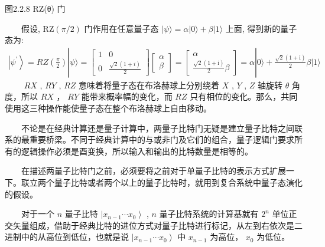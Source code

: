 \documentclass[a4paper,11pt,english]{sphinxmanual}
\begin{document}
\begin{center}图2.2.8 RZ(θ) 门
\end{center}
\sphinxAtStartPar
  假设,  \(\mathrm{RZ}(\pi / 2)\) 门作用在任意量子态  \(|\psi\rangle=\alpha|0\rangle+\beta|1\rangle\) 上面, 得到新的量子态为:
\begin{equation*}
\begin{split}\left|\psi^{\prime}\right\rangle=R Z\left(\frac{\pi}{2}\right)|\psi\rangle=\left[\begin{array}{cc} 1 & 0 \\ 0 & \frac{\sqrt{2}(1+i)}{2} \end{array}\right]\left[\begin{array}{c} \alpha \\ \beta \end{array}\right]=\left[\begin{array}{c} \alpha \\ \frac{\sqrt{2}(1+\mathrm{i})}{2} \beta \end{array}\right]=\alpha|0\rangle+\frac{\sqrt{2}(1+\mathrm{i})}{2} \beta|1\rangle\end{split}
\end{equation*}
\sphinxAtStartPar
   \(RX\) , \(RY\) , \(RZ\) 意味着将量子态在布洛赫球上分别绕着 \(X\) , \(Y\) , \(Z\) 轴旋转 \(\theta\) 角度，所以 \(RX\) ， \(RY\) 能带来概率幅的变化，而 \(RZ\) 只有相位的变化。那么，共同使用这三种操作能使量子态在整个布洛赫球上自由移动。

\sphinxAtStartPar
{}

\sphinxAtStartPar
  不论是在经典计算还是量子计算中，两量子比特门无疑是建立量子比特之间联系的最重要桥梁。不同于经典计算中的与或非门及它们的组合，量子逻辑门要求所有的逻辑操作必须是酉变换，所以输入和输出的比特数量是相等的。

\sphinxAtStartPar
  在描述两量子比特门之前，必须要将之前对于单量子比特的表示方式扩展一下。联立两个量子比特或者两个以上的量子比特时，就用到复合系统中量子态演化的假设。

\sphinxAtStartPar
  对于一个 \(n\) 量子比特 \(\left|x_{n-1} \cdots x_{0}\right\rangle\) , \(n\) 量子比特系统的计算基就有 \(2^{n}\) 单位正交矢量组成，借助于经典比特的进位方式对量子比特进行标记，从左到右依次是二进制中的从高位到低位，也就是说 \(\left|x_{n-1} \cdots x_{0}\right\rangle\) 中  \(x_{n-1}\) 为高位， \(x_{0}\) 为低位。
\end{document}
